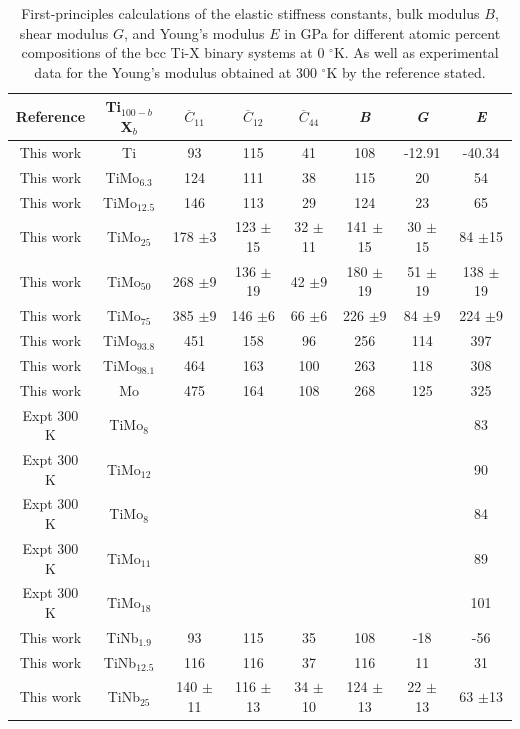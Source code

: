 \newpage
\begin{longtable}[H]{ c c c c c c c c}
	\caption{First-principles calculations of the elastic stiffness constants, bulk modulus $B$, shear modulus $G$, and Young's modulus $E$ in GPa for different atomic percent compositions of the bcc Ti-X binary systems at 0 $^\circ$K. As well as experimental data for the Young's modulus obtained at 300 $^\circ$K by the reference stated.} 	\label{Ch5-table:tixelasdata} \\
	\hline
	Reference & Ti$_{100-b}$X$_b$ & $\overline{C}_{11}$ & $\overline{C}_{12}$ & $\overline{C}_{44}$ & \textit{B} & \textit{G} & \textit{E}\\
	\hline
	\endhead
	\hline
	\endfoot
	This work & Ti & 93 & 115 & 41 & 108 & -12.91 & -40.34\\
	This work & TiMo$_{6.3}$ & 124 & 111 & 38 & 115 & 20 & 54\\
	This work & TiMo$_{12.5}$ & 146 & 113 & 29 & 124 & 23 & 65\\
	This work & TiMo$_{25}$ & 178 $\pm$3 & 123 $\pm$15 & 32 $\pm$11 & 141 $\pm$15 & 30 $\pm$15 & 84 $\pm$15\\
	This work & TiMo$_{50}$ & 268 $\pm$9 & 136 $\pm$19 & 42 $\pm$9 & 180 $\pm$19 & 51 $\pm$19 & 138 $\pm$19\\
	This work & TiMo$_{75}$ & 385 $\pm$9 & 146 $\pm$6 & 66 $\pm$6 & 226 $\pm$9 & 84 $\pm$9 & 224 $\pm$9\\
	This work & TiMo$_{93.8}$ & 451 & 158 & 96 & 256 & 114 & 397\\
	This work & TiMo$_{98.1}$ & 464 & 163 & 100 & 263 & 118 & 308\\
	This work & Mo & 475 & 164 & 108 & 268 & 125 & 325\\
	Expt 300 K \cite{Zhang2015} & TiMo$_8$ & & & & & & 83\\
	Expt 300 K \cite{Zhang2015} & TiMo$_{12}$ & & & & & & 90\\
	Expt 300 K \cite{Boyer1994} & TiMo$_{8}$ & & & & & & 84\\
	Expt 300 K \cite{Boyer1994} & TiMo$_{11}$ & & & & & & 89\\
	Expt 300 K \cite{Boyer1994} & TiMo$_{18}$ & & & & & & 101\\
	This work & TiNb$_{1.9}$ & 93 & 115 & 35 & 108 & -18 & -56\\
	This work & TiNb$_{12.5}$ & 116 & 116 & 37 & 116 & 11 & 31\\
	This work & TiNb$_{25}$ & 140 $\pm$11 & 116 $\pm$13 & 34 $\pm$10 & 124 $\pm$13 & 22 $\pm$13 & 63 $\pm$13\\

\end{longtable}
